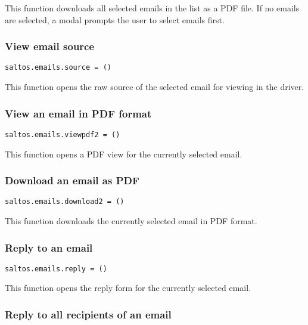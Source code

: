 \documentclass[a4paper]{article}
\begin{document}
This function downloads all selected emails in the list as a PDF file.
If no emails are selected, a modal prompts the user to select emails first.

\hypertarget{toc64}{}
\subsubsection{View email source}

\begin{lstlisting}
saltos.emails.source = ()
\end{lstlisting}

This function opens the raw source of the selected email for viewing in the driver.

\hypertarget{toc65}{}
\subsubsection{View an email in PDF format}

\begin{lstlisting}
saltos.emails.viewpdf2 = ()
\end{lstlisting}

This function opens a PDF view for the currently selected email.

\hypertarget{toc66}{}
\subsubsection{Download an email as PDF}

\begin{lstlisting}
saltos.emails.download2 = ()
\end{lstlisting}

This function downloads the currently selected email in PDF format.

\hypertarget{toc67}{}
\subsubsection{Reply to an email}

\begin{lstlisting}
saltos.emails.reply = ()
\end{lstlisting}

This function opens the reply form for the currently selected email.

\hypertarget{toc68}{}
\subsubsection{Reply to all recipients of an email}
\end{document}
